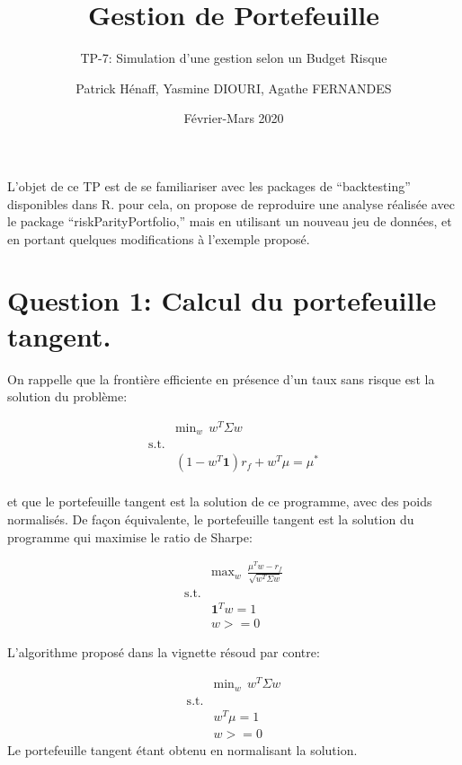 \documentclass[
]{article}
\title{Gestion de Portefeuille}
\subtitle{TP-7: Simulation d'une gestion selon un Budget Risque}
\author{Patrick Hénaff, Yasmine DIOURI, Agathe FERNANDES}
\date{Février-Mars 2020}
\begin{document}
\maketitle

L'objet de ce TP est de se familiariser avec les packages de
``backtesting'' disponibles dans R. pour cela, on propose de reproduire
une analyse réalisée avec le package ``riskParityPortfolio,'' mais en
utilisant un nouveau jeu de données, et en portant quelques
modifications à l'exemple proposé.

\hypertarget{question-1-calcul-du-portefeuille-tangent.}{%
\section{Question 1: Calcul du portefeuille
tangent.}\label{question-1-calcul-du-portefeuille-tangent.}}

On rappelle que la frontière efficiente en présence d'un taux sans
risque est la solution du problème:

\[
\begin{aligned}
    & \mbox{min}_w \ \   w^T \Sigma w \\
    \mbox{s.t.} & \\
    & \left(1- w^T \mathbf{1} \right) r_f + w^T \mu = \mu^* \\
\end{aligned}
\]

et que le portefeuille tangent est la solution de ce programme, avec des
poids normalisés. De façon équivalente, le portefeuille tangent est la
solution du programme qui maximise le ratio de Sharpe:

\[
\begin{aligned}
    & \mbox{max}_w \ \   \frac{\mu^T w - r_f}{\sqrt{w^T \Sigma w}} \\
    \mbox{s.t.} & \\
    & \mathbf{1}^T w = 1 \\
    & w >= 0
    \end{aligned}
\]

L'algorithme proposé dans la vignette résoud par contre:

\[
\begin{aligned}
    & \mbox{min}_w \ \   w^T \Sigma w \\
    \mbox{s.t.} & \\
    & w^T \mu = 1 \\
    & w >= 0
\end{aligned}
\] Le portefeuille tangent étant obtenu en normalisant la solution.
\end{document}

